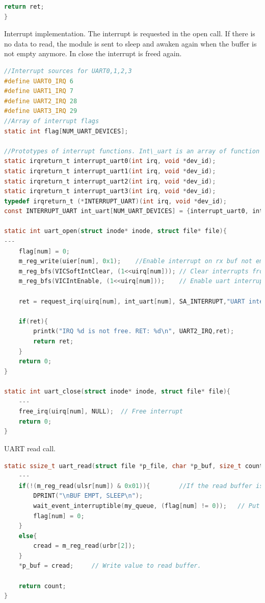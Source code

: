 \begin{lstlisting}[language=c]
        return ret;
}
\end{lstlisting}

Interrupt implementation. The interrupt is requested in the open call. If there is no data to read, the module is sent to sleep and awaken again when the buffer is not empty anymore. In close the interrupt is freed again. 
\begin{lstlisting}[language=c]
//Interrupt sources for UART0,1,2,3
#define UART0_IRQ 6 
#define UART1_IRQ 7
#define UART2_IRQ 28
#define UART3_IRQ 29
//Array of interrupt flags
static int flag[NUM_UART_DEVICES];

//Prototypes of interrupt functions. Int\_uart is an array of function pointers.
static irqreturn_t interrupt_uart0(int irq, void *dev_id);
static irqreturn_t interrupt_uart1(int irq, void *dev_id);
static irqreturn_t interrupt_uart2(int irq, void *dev_id);
static irqreturn_t interrupt_uart3(int irq, void *dev_id);
typedef irqreturn_t (*INTERRUPT_UART)(int irq, void *dev_id);
const INTERRUPT_UART int_uart[NUM_UART_DEVICES] = {interrupt_uart0, interrupt_uart1, interrupt_uart2, interrupt_uart3};

static int uart_open(struct inode* inode, struct file* file){
---
	flag[num] = 0;
	m_reg_write(uier[num], 0x1);	//Enable interrupt on rx buf not empty
	m_reg_bfs(VICSoftIntClear, (1<<uirq[num])); // Clear interrupts from uart source
	m_reg_bfs(VICIntEnable, (1<<uirq[num]));    // Enable uart interrupt

	ret = request_irq(uirq[num], int_uart[num], SA_INTERRUPT,"UART interrupt", NULL); //NULL = Pointer based on IRC handler

	if(ret){
		printk("IRQ %d is not free. RET: %d\n", UART2_IRQ,ret);
		return ret;
	}
	return 0;
}

static int uart_close(struct inode* inode, struct file* file){
	---
	free_irq(uirq[num], NULL);	// Free interrupt
	return 0;
}
\end{lstlisting}
UART read call.
\begin{lstlisting}[language=c]
static ssize_t uart_read(struct file *p_file, char *p_buf, size_t count, loff_t *p_pos){
	---
	if(!(m_reg_read(ulsr[num]) & 0x01)){		//If the read buffer is empty, go to sleep.
		DPRINT("\nBUF EMPT, SLEEP\n");
		wait_event_interruptible(my_queue, (flag[num] != 0));	// Put the function to sleep
		flag[num] = 0;
	}
	else{
		cread = m_reg_read(urbr[2]);
	}
	*p_buf = cread;		// Write value to read buffer. 
	
	return count;
}
\end{lstlisting}
